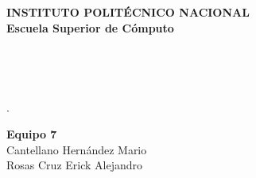 \begin{center}
	{\bf
		INSTITUTO POLIT\'ECNICO NACIONAL\\
		Escuela Superior de Cómputo\\[12pt]
	}
	\begin{large} \em
		\nameSubject\\
	\end{large}
	\nameProfessor\\[12pt]
	\begin{large}
		\nameDoc.\\[30 pt]
	\end{large}
	{\bf Equipo 7}\\
		Cantellano Hern\'andez Mario\\[3 pt]
		Rosas Cruz Erick Alejandro\\[10 pt]
\end{center}
